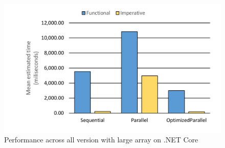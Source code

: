 \begin{figure}[htb]
\centering
\includegraphics[width=.8\linewidth]{figures04/FuncVsImp1000000.pdf}
\caption{Performance across all version with large array on .NET Core}
\label{fig:FuncVsImp1000000}
\end{figure}

